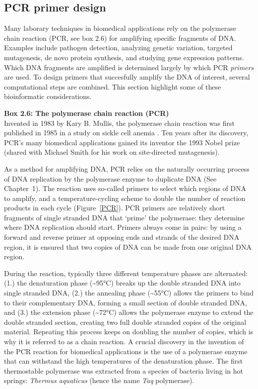 \subsection{PCR primer design}

Many laborary techniques in biomedical applications rely on the polymerase chain reaction (PCR, see box 2.6) for amplifying specific fragments of DNA. Examples include pathogen detection, analyzing genetic variation, targeted mutagenesis, de novo protein synthesis, and studying gene expression patterns. Which DNA fragments are amplified is determined largely by which PCR \textit{primers} are used. To design primers that succesfully amplify the DNA of interest, several computational steps are combined. This section highlight some of these bioinformatic considerations.

\begin{framed}
\textbf{Box 2.6: The polymerase chain reaction (PCR)}\\
Invented in 1983 by Kary B. Mullis, the polymerase chain reaction was first published in 1985 in a study on sickle cell anemia \cite{saiki1985enzymatic}. Ten years after its discovery, PCR's many biomedical applications gained its inventor the 1993 Nobel prize (shared with Michael Smith for his work on site-directed mutagenesis).

As a method for amplifying DNA, PCR relies on the naturally occurring process of DNA replication by the polymerase enzyme to duplicate DNA (See Chapter~1). The reaction uses so-called primers to select which regions of DNA to amplify, and a temperature-cycling scheme to double the number of reaction products in each cycle (Figure~\ref{PCR}). PCR primers are relatively short fragments of single stranded DNA that `prime' the polymerase: they determine where DNA replication should start. Primers always come in pairs: by using a forward and reverse primer at opposing ends and strands of the desired DNA region, it is ensured that two copies of DNA can be made from one original DNA region.

During the reaction, typically three different temperature phases are alternated: (1.) the denaturation phase ({\textasciitilde}95°C) breaks up the double stranded DNA into single stranded DNA, (2.) the annealing phase ({\textasciitilde}55°C) allows the primers to bind to their complementary DNA, forming a small section of double stranded DNA, and (3.) the extension phase ({\textasciitilde}72°C) allows the polymerase enzyme to extend the double stranded section, creating two full double stranded copies of the original material. Repeating this process keeps on doubling the number of copies, which is why it is referred to as a chain reaction.
A crucial discovery in the invention of the PCR reaction for biomedical applications is the use of a polymerase enzyme that can withstand the high temperatures of the denaturation phase. The first thermostable polymerase was extracted from a species of bacteria living in hot springs: \textit{Thermus aquaticus} (hence the name \textit{Taq} polymerase).


\end{framed}
